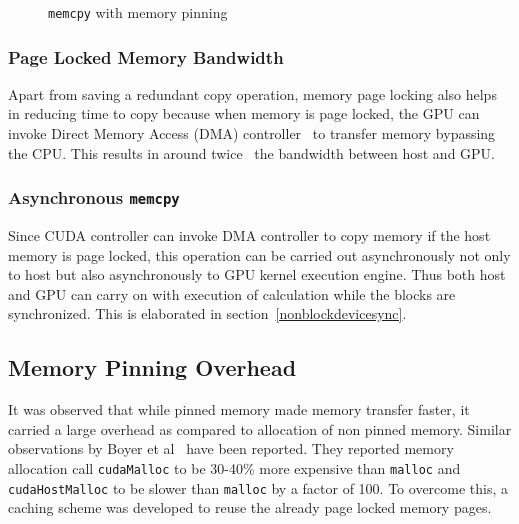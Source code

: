 \begin{figure}[h] %
  \caption{\texttt{memcpy} with memory pinning}\label{fig:w_mem_pin}
\end{figure}

\subsubsection{Page Locked Memory Bandwidth}
Apart from saving a redundant copy operation, memory page locking also helps in
reducing time to copy because when memory is page locked, the GPU can invoke Direct
Memory Access (DMA)
controller~\cite{dmatransfer}\cite{whypinnedfast}\cite{teslaspecs}\cite{teslakspecs}
to transfer memory bypassing the CPU. This results in around
twice~\cite{datatransferoptimization} the bandwidth between host and GPU.

\subsubsection{Asynchronous \texttt{memcpy}}
Since CUDA controller can invoke DMA controller to copy memory if the host memory
is page locked, this operation can be carried out asynchronously not only to host but
also asynchronously to GPU kernel execution engine. Thus both host and GPU can carry
on with execution of calculation while the blocks are synchronized. This is
elaborated in section~\ref{nonblockdevicesync}.

\subsection{Memory Pinning Overhead}
It was observed that while pinned memory made memory transfer faster, it carried
a large overhead as compared to allocation of non pinned memory. Similar observations
by Boyer et al~\cite{Boyer2009}\cite{memory-management-overhead}\cite{pinned-tradeoff}
have been reported. They reported memory allocation call \texttt{cudaMalloc} to
be 30-40\% more expensive than \texttt{malloc} and \texttt{cudaHostMalloc} to be
slower than \texttt{malloc} by a factor of 100. To overcome this, a caching scheme was
developed to reuse the already page locked memory pages.

